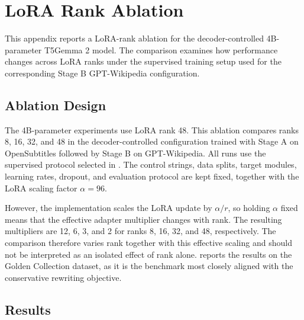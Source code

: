 \chapter{LoRA Rank Ablation}
\label{chap:appendix-lora-rank}

This appendix reports a LoRA-rank ablation for the decoder-controlled
4B-parameter T5Gemma 2 model. The comparison examines how performance changes
across LoRA ranks under the supervised training setup used for the corresponding
Stage B GPT-Wikipedia configuration.

\section{Ablation Design}

The 4B-parameter experiments use LoRA rank 48. This ablation compares ranks 8,
16, 32, and 48 in the decoder-controlled configuration trained with Stage A on
OpenSubtitles followed by Stage B on GPT-Wikipedia. All runs use the supervised
protocol selected in . The control
strings, data splits, target modules, learning rates, dropout, and evaluation
protocol are kept fixed, together with the LoRA scaling factor $\alpha = 96$.

{
However, the implementation scales the LoRA update by $\alpha/r$, so holding
$\alpha$ fixed means that the effective adapter multiplier changes with rank.
The resulting multipliers are 12, 6, 3, and 2 for ranks 8, 16, 32, and
48, respectively. The comparison therefore varies rank together with this
effective scaling and should not be interpreted as an isolated effect of rank
alone.
 reports the results on the Golden Collection
dataset, as it is the benchmark most closely aligned with the conservative
rewriting objective.\par}

\section{Results}

